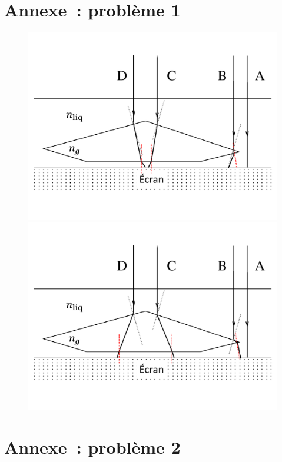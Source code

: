 \documentclass[a4paper, 10pt, garamond, oneside]{book}
\begin{document}
{	\newpage
	\chapter*{Annexe~: problème 1}

	\begin{figure}[htbp]
		\centering
		{\includegraphics[width=.7\linewidth]{gemme_c1}}
		{\includegraphics[width=.7\linewidth]{gemme_c2}}
		\caption{}
    \label{fig:gemmes_corr}
	\end{figure}

	\newpage
	\chapter*{Annexe~: problème 2}

}
\end{document}

